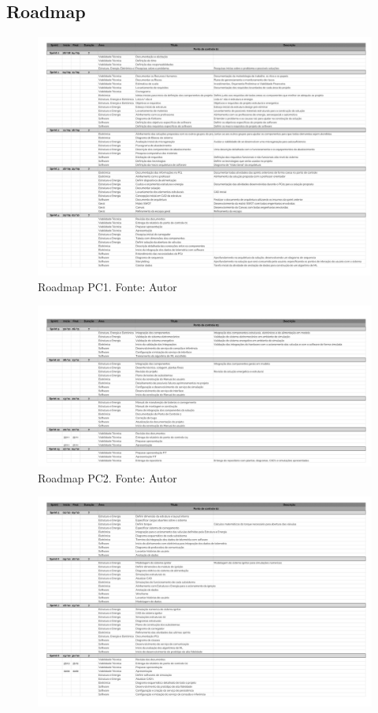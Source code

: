 \begin{apendicesenv}
\chapter{Roadmap}
\label{Roadmap}
\begin{figure}[htb]
    \centering
    \includegraphics[width=1\textwidth]{figuras/Roadmap-PC1.png}
    \caption{Roadmap PC1. Fonte: Autor}
    \label{fig:Roadmap PC1}
\end{figure}
\begin{figure}[htb]
    \centering
    \includegraphics[width=1\textwidth]{figuras/Roadmap-PC2.png}
    \caption{Roadmap PC2. Fonte: Autor}
    \label{fig:Roadmap PC2}
\end{figure}
\begin{figure}[htb]
    \centering
    \includegraphics[width=1\textwidth]{figuras/Roadmap-PC3.png}

\end{figure}
\end{apendicesenv}

